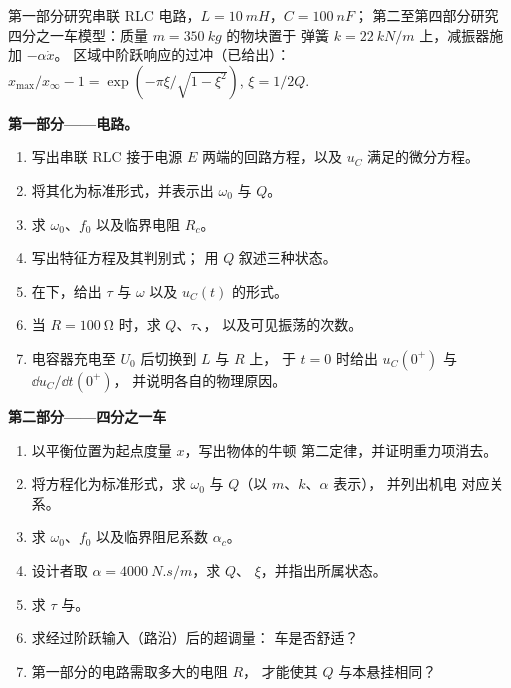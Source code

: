 \begin{problem}
\label{pb:b1:transient-regimes:1}
第一部分研究串联 RLC 电路，$L = \qty{10}{mH}$，$C = \qty{100}{nF}$；
第二至第四部分研究四分之一车模型：质量 $m = \qty{350}{kg}$ 的物块置于
弹簧 $k = \qty{22}{kN/m}$ 上，减振器施加 $-\alpha\dot x$。
区域中阶跃响应的过冲（已给出）：
$x_{\max}/x_\infty - 1 = \exp(-\pi\xi/\sqrt{1 - \xi^2})$, $\xi = 1/2Q$.

\medskip
\noindent\textbf{第一部分——电路。}
\begin{enumerate}
  \item 写出串联 RLC 接于电源 $E$ 两端的回路方程，以及
        $u_C$ 满足的微分方程。
  \item 将其化为标准形式，并表示出 $\omega_0$ 与 $Q$。
  \item 求 $\omega_0$、$f_0$ 以及临界电阻 $R_c$。
  \item 写出特征方程及其判别式；
        用 $Q$ 叙述三种状态。
  \item 在下，给出 $\tau$ 与 $\omega$ 以及
        $u_C(t)$ 的形式。
  \item 当 $R = \qty{100}{\ohm}$ 时，求 $Q$、$\tau$、，
        以及可见振荡的次数。
  \item 电容器充电至 $U_0$ 后切换到 $L$ 与 $R$ 上，
        于 $t = 0$ 时给出 $u_C(0^+)$ 与 $\dd u_C/\dd t(0^+)$，
        并说明各自的物理原因。
\end{enumerate}

\medskip
\noindent\textbf{第二部分——四分之一车}
\begin{enumerate}[resume]
  \item 以平衡位置为起点度量 $x$，写出物体的牛顿
        第二定律，并证明重力项消去。
  \item 将方程化为标准形式，求 $\omega_0$ 与 $Q$（以 $m$、$k$、$\alpha$ 表示），
        并列出机电
        对应关系。
  \item 求 $\omega_0$、$f_0$ 以及临界阻尼系数
        $\alpha_c$。
  \item 设计者取 $\alpha = \qty{4000}{N.s/m}$，求 $Q$、
        $\xi$，并指出所属状态。
  \item 求 $\tau$ 与。
  \item 求经过阶跃输入（路沿）后的超调量：
        车是否舒适？
  \item 第一部分的电路需取多大的电阻 $R$，
        才能使其 $Q$ 与本悬挂相同？
\end{enumerate}


\end{problem}
